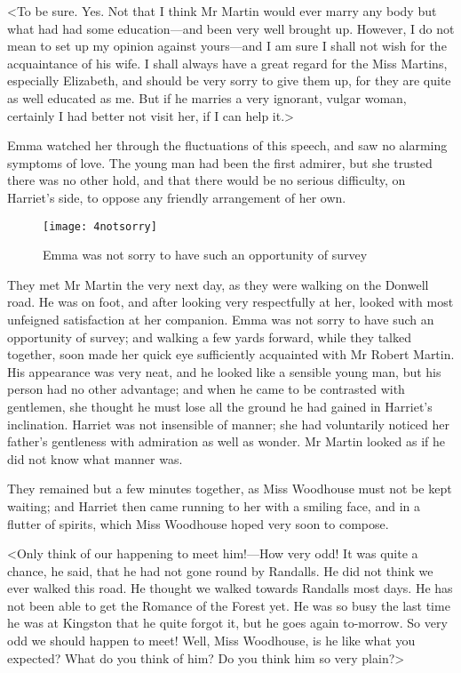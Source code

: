 <To be sure. Yes. Not that I think Mr Martin would ever marry any body but what had had some education—and been very well brought up. However, I do not mean to set up my opinion against yours—and I am sure I shall not wish for the acquaintance of his wife. I shall always have a great regard for the Miss Martins, especially Elizabeth, and should be very sorry to give them up, for they are quite as well educated as me. But if he marries a very ignorant, vulgar woman, certainly I had better not visit her, if I can help it.>

Emma watched her through the fluctuations of this speech, and saw no alarming symptoms of love. The young man had been the first admirer, but she trusted there was no other hold, and that there would be no serious difficulty, on Harriet's side, to oppose any friendly arrangement of her own.

\begin{figure}[tbph]
\centering
\texttt{[image: 4notsorry]}
\caption{Emma was not sorry to have such an opportunity of survey}
\end{figure}

They met Mr Martin the very next day, as they were walking on the Donwell road. He was on foot, and after looking very respectfully at her, looked with most unfeigned satisfaction at her companion. Emma was not sorry to have such an opportunity of survey; and walking a few yards forward, while they talked together, soon made her quick eye sufficiently acquainted with Mr Robert Martin. His appearance was very neat, and he looked like a sensible young man, but his person had no other advantage; and when he came to be contrasted with gentlemen, she thought he must lose all the ground he had gained in Harriet's inclination. Harriet was not insensible of manner; she had voluntarily noticed her father's gentleness with admiration as well as wonder. Mr Martin looked as if he did not know what manner was.

They remained but a few minutes together, as Miss Woodhouse must not be kept waiting; and Harriet then came running to her with a smiling face, and in a flutter of spirits, which Miss Woodhouse hoped very soon to compose.

<Only think of our happening to meet him!—How very odd! It was quite a chance, he said, that he had not gone round by Randalls. He did not think we ever walked this road. He thought we walked towards Randalls most days. He has not been able to get the Romance of the Forest yet. He was so busy the last time he was at Kingston that he quite forgot it, but he goes again to-morrow. So very odd we should happen to meet! Well, Miss Woodhouse, is he like what you expected? What do you think of him? Do you think him so very plain?>

